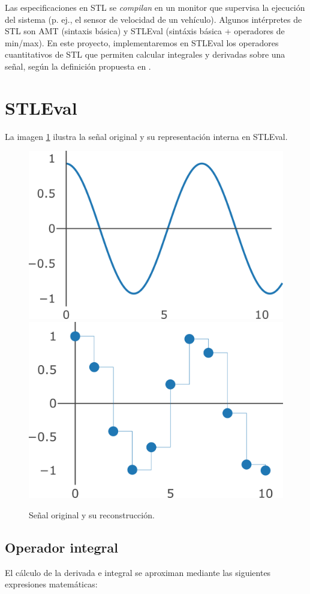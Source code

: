Las especificaciones en STL se \textit{compilan} en un monitor que supervisa la ejecución del sistema (p. ej., el sensor de velocidad de un vehículo). Algunos intérpretes de STL son AMT \cite{AMT2} (sintaxis básica) y STLEval \cite{StlEval} (sintáxis básica + operadores de min/max). En este proyecto, implementaremos en STLEval los operadores cuantitativos de STL que permiten calcular integrales y derivadas sobre una señal, según la definición propuesta en \cite{Stl_Der_Int}.

\section{STLEval}

La imagen \ref{fig:senal} ilustra la señal original y su representación interna en STLEval. 

\begin{figure}
\centering
  \includegraphics[width=.4\linewidth]{images/senal_original} \hfill
  \includegraphics[width=.4\linewidth]{images/senal_muestreada}
\caption{Señal original y su reconstrucción.}
\label{fig:senal}
\end{figure}

\subsection{Operador integral}

El cálculo de la derivada e integral se aproximan mediante las siguientes expresiones matemáticas:


